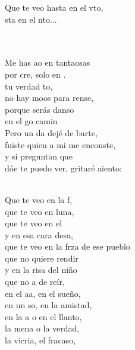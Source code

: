 \begin{cancion}
\begin{chorus}
	Que te veo hasta en el vto, \\
	sta en el nto...\\
	\end{chorus}%
	\jump\\
	   \\
	Me has ao en tantaosas \\
	por cre, solo en . \\
	 tu verdad to, \\
	no hay moos para rense,\\
	porque  serás danso \\
	en el go camin\\
	Pero un da dejé de barte, \\
	fuiste  quien a mi me enconste, \\
	y si  preguntan que \\
	dóe te puedo ver, gritaré aiento:\\\jump\\
	\begin{chorus}%
	Que te veo en la f, \\
	que te veo en luna,\\
	que te veo en el  \\
	y en esa cara desa,\\
	que te veo en la frza de ese pueblo\\
	que no  quiere rendir\\
	y en la risa del niño \\
	que no a de reír,\\
	en el aa, en el sueño, \\
	en un so, en la amistad,\\
	en la a o en el llanto, \\
	la mena o la verdad,\\
	la vicria, el fracaso, \\

\end{chorus}
\end{cancion}
